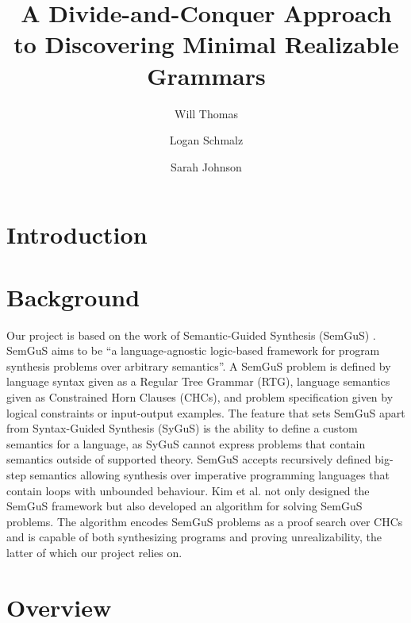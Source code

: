 \documentclass[acmsmall, nonacm]{acmart}
\begin{document}
\title{A Divide-and-Conquer Approach to Discovering Minimal Realizable Grammars}


\author{Will Thomas}
\author{Logan Schmalz}
\author{Sarah Johnson}


\maketitle

\section{Introduction}

\section{Background}
Our project is based on the work of Semantic-Guided Synthesis (SemGuS) \cite{semgus}. SemGuS aims to be ``a language-agnostic logic-based framework for program synthesis problems over arbitrary semantics''. A SemGuS problem is defined by language syntax given as a Regular Tree Grammar (RTG), language semantics given as Constrained Horn Clauses (CHCs), and problem specification given by logical constraints or input-output examples. The feature that sets SemGuS apart from Syntax-Guided Synthesis (SyGuS) is the ability to define a custom semantics for a language, as SyGuS cannot express problems that contain semantics outside of supported theory. SemGuS accepts recursively defined big-step semantics allowing synthesis over imperative programming languages that contain loops with unbounded behaviour. Kim et al. not only designed the SemGuS framework but also developed an algorithm for solving SemGuS problems. The algorithm encodes SemGuS problems as a proof search over CHCs and is capable of both synthesizing programs and proving unrealizability, the latter of which our project relies on.


\section{Overview}
\end{document}
